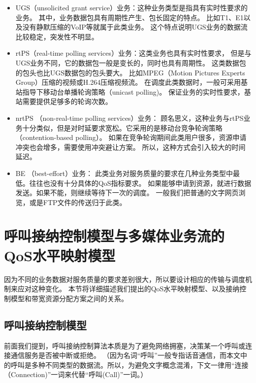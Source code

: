 \begin{itemize}
\item UGS（unsolicited grant service）业务：这种业务类型是指具有实时性要求的业务。
    其中，业务数据包具有周期性产生、包长固定的特点。
    比如T1、E1以及没有静默压缩的VoIP等就属于此类业务。
    这个特点说明UGS业务的数据流比较稳定，突发性不明显。
\item rtPS（real-time polling services）业务：这类业务也具有实时性要求，
    但是与UGS业务不同，它的数据包一般是变长的，同时也具有周期性。
    这类数据包的包头也比UGS数据包的包头要大。
    比如MPEG（Motion Pictures Experts Group）压缩的视频或H.264压缩视频流。
    在调度此类数据时，一般可采用基站指导下移动台单播轮询策略（unicast polling)。
    保证业务的实时性要求，基站需要提供足够多的轮询次数。
\item nrtPS （non-real-time polling services）业务：
    顾名思义，这种业务与rtPS业务十分类似，但是对时延要求宽松。它采用的是移动台竞争轮询策略（contention-based polling）。
    如果在竞争轮询期间此类用户很多，资源申请冲突也会增多，需要使用冲突避让方案。
    所以，这种方式会引入较大的时间延迟。
\item BE （best-effort）业务：
    此类业务对服务质量的要求在几种业务类型中最低。往往也没有十分具体的QoS指标要求。
    如果能够申请到资源，就进行数据发送。如果不能，则继续等待下一次的调度。
    一般我们把普通的文字网页浏览，或是FTP文件的传送归于此类。
\end{itemize}

\section{呼叫接纳控制模型与多媒体业务流的QoS水平映射模型}
\label{sec_qos_metric}
因为不同的业务数据对服务质量的要求差别很大，所以要设计相应的传输与调度机制来应对这种变化。
本节将详细描述我们提出的QoS水平映射模型、以及接纳控制模型和带宽资源分配方案之间的关系。

\subsection{呼叫接纳控制模型}
\label{sec_sec_model}
前面我们提到，呼叫接纳控制算法本质是为了避免网络拥塞，决策某一个呼叫或连接通信服务是否被中断或拒绝。
（因为名词“呼叫”一般专指话音通信，而本文中的呼叫是多种不同类型的数据流。所以，为避免文字概念混淆，下文一律用“连接（Connection)”一词来代替“呼叫(Call)”一词。）


